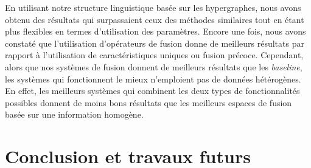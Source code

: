 \documentclass[a4paper,11pt,twoside]{article}
\begin{document}
En utilisant notre structure linguistique basée sur les hypergraphes, nous avons obtenu des résultats qui surpassaient ceux des méthodes similaires tout en étant plus flexibles en termes d'utilisation des paramètres. Encore une fois, nous avons constaté que l'utilisation d'opérateurs de fusion donne de meilleurs résultats par rapport à l'utilisation de caractéristiques uniques ou fusion précoce. Cependant, alors que nos systèmes de fusion donnent de meilleurs résultats que les \textit{baseline}, les systèmes qui fonctionnent le mieux n'emploient pas de données hétérogènes. En effet, les meilleurs systèmes qui combinent les deux types de fonctionnalités possibles donnent de moins bons résultats que les meilleurs espaces de fusion basée sur une information homogène.

\section{Conclusion et travaux futurs}
\end{document}
